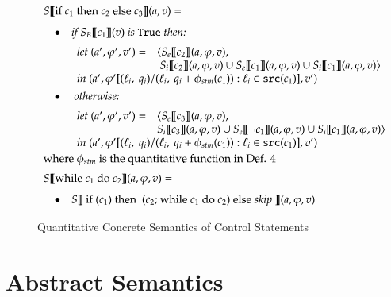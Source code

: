 \documentclass{llncs}
\begin{document}
\begin{figure}[H]
{\small \[
\begin{array}{ll}
\multicolumn{2}{l}{S [\![\mbox{if } c_1 \mbox{ then } c_2  \mbox{ else }c_3 ]\!](a, v) = }\\ [0.25cm]
\quad\bullet & \textit{if } S_B [\![c_1]\!](v) \textit{ is }\texttt{True}\textit{ then:}\\[0.2cm]
& \begin{array}{ll}
\textit{let }(a', \varphi', v')  = & \langle S_e [\![c_2 ]\!](a, \varphi, v),\ \\
& \ S_i [\![c_2 ]\!](a, \varphi, v) \cup S_e [\![c_1 ]\!](a, \varphi, v) \cup S_i [\![c_1 ]\!](a, \varphi, v) \rangle \\
\multicolumn{2}{l}{\textit{in } (a', \varphi'[(\ell_i,\ q_i)/(\ell_i,\ q_i+\phi_{stm} (c_1)): \ell_i \in \texttt{src}(c_1)], v') }\\
\end{array}\\[0.55cm]
\quad\bullet & \textit{ otherwise:}\\ [0.2cm]
& \begin{array}{ll}
\textit{let }(a', \varphi', v')  = & \langle S_e [\![c_3 ]\!](a, \varphi, v),\ \\
& S_i [\![c_3 ]\!](a, \varphi, v) \cup S_e [\![\neg c_1 ]\!](a, \varphi, v) \cup S_i [\![c_1 ]\!](a, \varphi, v) \rangle \\
\multicolumn{2}{l}{\textit{in } (a', \varphi'[(\ell_i,\ q_i)/(\ell_i,\ q_i+\phi_{stm} (c_1)): \ell_i \in \texttt{src}(c_1)], v')  }\\
\end{array}\\[0.5cm]
\multicolumn{2}{l}{\text{where } \phi_{stm} \text{ is the quantitative function in Def. 4} }\\[0.2cm]
\multicolumn{2}{l}{S [\![\mbox{while } c_1 \mbox{ do } c_2]\!](a, \varphi, v)  = }\\[0.25cm]
\quad\bullet & S [\![\mbox{ if } (c_1) \mbox{ then } \mbox{ (}c_2\mbox{; while } c_1 \mbox{ do } c_2 ) \mbox{ else \textit{skip} }]\!](a, \varphi, v)\\
\end{array}
\]}
\caption{Quantitative Concrete Semantics of Control Statements}
\label{quant_sem_cstm}
\end{figure}



\section{Abstract Semantics}
\end{document}
